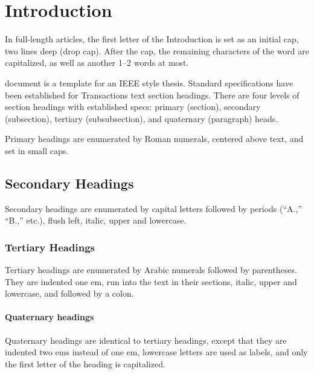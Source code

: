 \section{Introduction}

In full-length articles, the first letter of the Introduction is set as an initial cap, two lines deep (drop cap). After the cap, the remaining characters of the word are capitalized, as well as another 1--2 words at most.

 document is a template for an IEEE style thesis. Standard specifications have been established for Transactions text section headings. There are four levels of section headings with established specs: primary (section), secondary (subsection), tertiary (subsubsection), and quaternary (paragraph) heads.

Primary headings are enumerated by Roman numerals, centered above text, and set in small caps.

\subsection{Secondary Headings}

Secondary headings are enumerated by capital letters followed by periods (``A.,'' ``B.,'' etc.), flush left, italic, upper and lowercase.

\subsubsection{Tertiary Headings}

Tertiary headings are enumerated by Arabic numerals followed by parentheses. They are indented one em, run into the text in their sections, italic, upper and lowercase, and followed by a colon.

\paragraph{Quaternary headings}

Quaternary headings are identical to tertiary headings, except that they are indented two ems instead of one em, lowercase letters are used as labels, and only the first letter of the heading is capitalized.
